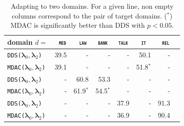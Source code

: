 \documentclass[11pt]{article}
\newcommand{\domain}[1]{\texttt{\textsc{#1}}}
\newcommand{\system}[1]{\texttt{{#1}}}
\newcommand{\vlambda}{\ensuremath{\boldsymbol\lambda}\xspace} %
\begin{document}
\begin{table}[htbp]
  \centering \small
  \begin{tabular}{|l|*7{r|}} \hline
    domain \hfill $d=$ & \multicolumn{1}{c|}{\domain{ med}} & \multicolumn{1}{c|}{\domain{ law}} & \multicolumn{1}{c|}{\domain{bank}} & \multicolumn{1}{c|}{\domain{talk}} & \multicolumn{1}{c|}{\domain{ it }} & \multicolumn{1}{c|}{\domain{ rel}} \\ \hline \hline
    \system{DDS($\vlambda_0, \vlambda_2$)}&39.5&-&-&-&50.1&- \\
    \system{MDAC($\vlambda_0, \vlambda_2$)}&39.1&-&-&-&51.8$^*$&- \\
    \system{DDS($\vlambda_0, \vlambda_2$)}&-&60.8&53.3&-&-&- \\
    \system{MDAC($\vlambda_0, \vlambda_2$)}&-&61.9$^*$&54.5$^*$&-&-&- \\
    \system{DDS($\vlambda_0, \vlambda_2$)}&-&-&-&37.9&-&91.3 \\ 
    \system{MDAC($\vlambda_0, \vlambda_2$)}&-&-&-&36.9&-&90.4 \\
    \hline
  \end{tabular}
  \caption{Adapting to two domains. For a given line, non empty columns correspond to the pair of target domains. ($^*$) MDAC is significantly better than DDS with $p<0.05$.}
  \label{tab:bi-da}
\end{table}
\end{document}
